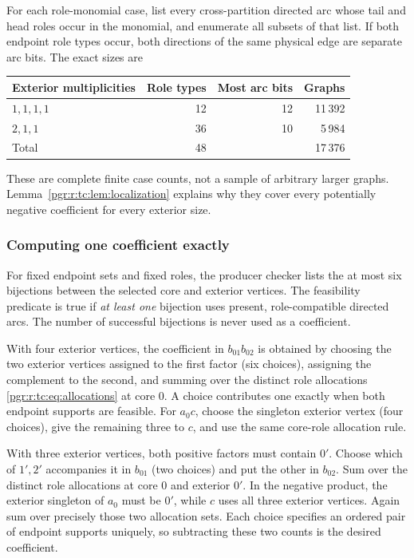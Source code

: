 \documentclass[11pt]{article}
\numberwithin{equation}{section}
\theoremstyle{definition}\newtheorem{definition}[theorem]{Definition}\newtheorem{remark}[theorem]{Remark}
\begin{document}
For each role-monomial case, list every cross-partition directed arc whose
tail and head roles occur in the monomial, and enumerate all subsets of that
list. If both endpoint role types occur, both directions of the same physical
edge are separate arc bits. The exact sizes are
\begin{center}
\begin{tabular}{lrrr}
\toprule
Exterior multiplicities & Role types & Most arc bits & Graphs\\
\midrule
$1,1,1,1$ & 12 & 12 & 11\,392\\
$2,1,1$   & 36 & 10 & 5\,984\\
\midrule
Total     & 48 & & 17\,376\\
\bottomrule
\end{tabular}
\end{center}
These are complete finite case counts, not a sample of arbitrary larger
graphs. Lemma~\ref{pgr:r:tc:lem:localization} explains why they cover every potentially
negative coefficient for every exterior size.

\subsubsection*{Computing one coefficient exactly}
For fixed endpoint sets and fixed roles, the producer checker lists the at
most six bijections between the selected core and exterior vertices. The
feasibility predicate is true if \emph{at least one} bijection uses present,
role-compatible directed arcs. The number of successful bijections is never
used as a coefficient.

With four exterior vertices, the coefficient in $b_{01}b_{02}$ is obtained
by choosing the two exterior vertices assigned to the first factor (six
choices), assigning the complement to the second, and summing over the
distinct role allocations \eqref{pgr:r:tc:eq:allocations} at core $0$. A choice
contributes one exactly when both endpoint supports are feasible. For $a_0c$,
choose the singleton exterior vertex (four choices), give the remaining
three to $c$, and use the same core-role allocation rule.

With three exterior vertices, both positive factors must contain $0'$.
Choose which of $1',2'$ accompanies it in $b_{01}$ (two choices) and put the
other in $b_{02}$. Sum over the distinct role allocations at core $0$ and
exterior $0'$. In the negative product, the exterior singleton of $a_0$ must
be $0'$, while $c$ uses all three exterior vertices. Again sum over precisely
those two allocation sets. Each choice specifies an ordered pair of endpoint
supports uniquely, so subtracting these two counts is the desired coefficient.
\end{document}
